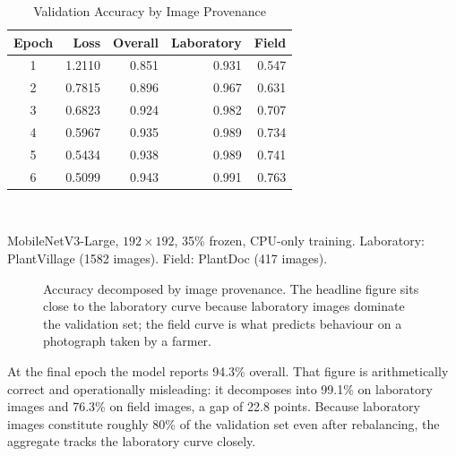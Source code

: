 \documentclass[conference]{IEEEtran}
\begin{document}
\begin{table}[!t]
\caption{Validation Accuracy by Image Provenance}
\label{tab:results}
\centering
\footnotesize
\begin{tabular}{@{}crrrr@{}}
\toprule
Epoch & Loss & Overall & Laboratory & Field \\
\midrule
1 & 1.2110 & 0.851 & 0.931 & 0.547 \\
2 & 0.7815 & 0.896 & 0.967 & 0.631 \\
3 & 0.6823 & 0.924 & 0.982 & 0.707 \\
4 & 0.5967 & 0.935 & 0.989 & 0.734 \\
5 & 0.5434 & 0.938 & 0.989 & 0.741 \\
6 & 0.5099 & 0.943 & 0.991 & 0.763 \\
\bottomrule
\end{tabular}
\\[3pt]
\raggedright\scriptsize
MobileNetV3-Large, $192\times192$, 35\% frozen, CPU-only training.
Laboratory: PlantVillage (1582 images).
Field: PlantDoc (417 images).
\end{table}

\begin{figure}[!t]
\centering
{}
\caption{Accuracy decomposed by image provenance. The headline figure sits
close to the laboratory curve because laboratory images dominate the
validation set; the field curve is what predicts behaviour on a photograph
taken by a farmer.}
\label{fig:gap}
\end{figure}

At the final epoch the model reports 94.3\% overall. That figure
is arithmetically correct and operationally misleading: it decomposes into 99.1\% on laboratory images and 76.3\% on field images,
a gap of 22.8 points. Because laboratory
images constitute roughly 80\% of the validation set even after rebalancing,
the aggregate tracks the laboratory curve closely.
\end{document}
